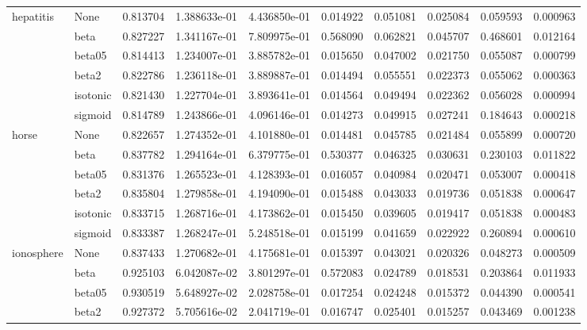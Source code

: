 \begin{tabular}{llrrrrrrrr}
hepatitis & None &  0.813704 &  1.388633e-01 &  4.436850e-01 &   0.014922 &  0.051081 &  0.025084 &  0.059593 &  0.000963 \\
        & beta &  0.827227 &  1.341167e-01 &  7.809975e-01 &   0.568090 &  0.062821 &  0.045707 &  0.468601 &  0.012164 \\
        & beta05 &  0.814413 &  1.234007e-01 &  3.885782e-01 &   0.015650 &  0.047002 &  0.021750 &  0.055087 &  0.000799 \\
        & beta2 &  0.822786 &  1.236118e-01 &  3.889887e-01 &   0.014494 &  0.055551 &  0.022373 &  0.055062 &  0.000363 \\
        & isotonic &  0.821430 &  1.227704e-01 &  3.893641e-01 &   0.014564 &  0.049494 &  0.022362 &  0.056028 &  0.000994 \\
        & sigmoid &  0.814789 &  1.243866e-01 &  4.096146e-01 &   0.014273 &  0.049915 &  0.027241 &  0.184643 &  0.000218 \\
horse & None &  0.822657 &  1.274352e-01 &  4.101880e-01 &   0.014481 &  0.045785 &  0.021484 &  0.055899 &  0.000720 \\
        & beta &  0.837782 &  1.294164e-01 &  6.379775e-01 &   0.530377 &  0.046325 &  0.030631 &  0.230103 &  0.011822 \\
        & beta05 &  0.831376 &  1.265523e-01 &  4.128393e-01 &   0.016057 &  0.040984 &  0.020471 &  0.053007 &  0.000418 \\
        & beta2 &  0.835804 &  1.279858e-01 &  4.194090e-01 &   0.015488 &  0.043033 &  0.019736 &  0.051838 &  0.000647 \\
        & isotonic &  0.833715 &  1.268716e-01 &  4.173862e-01 &   0.015450 &  0.039605 &  0.019417 &  0.051838 &  0.000483 \\
        & sigmoid &  0.833387 &  1.268247e-01 &  5.248518e-01 &   0.015199 &  0.041659 &  0.022922 &  0.260894 &  0.000610 \\
ionosphere & None &  0.837433 &  1.270682e-01 &  4.175681e-01 &   0.015397 &  0.043021 &  0.020326 &  0.048273 &  0.000509 \\
        & beta &  0.925103 &  6.042087e-02 &  3.801297e-01 &   0.572083 &  0.024789 &  0.018531 &  0.203864 &  0.011933 \\
        & beta05 &  0.930519 &  5.648927e-02 &  2.028758e-01 &   0.017254 &  0.024248 &  0.015372 &  0.044390 &  0.000541 \\
        & beta2 &  0.927372 &  5.705616e-02 &  2.041719e-01 &   0.016747 &  0.025401 &  0.015257 &  0.043469 &  0.001238 \\

\end{tabular}
